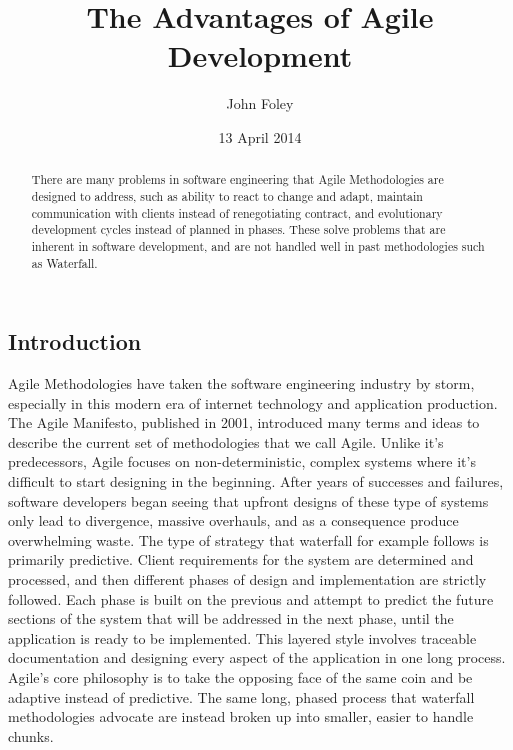 \documentclass[11pt]{article}
\title{The Advantages of Agile Development}
\author{John Foley}
\date{13 April 2014}
\begin{document}
\maketitle

\thispagestyle{empty}

\begin{abstract}
  There are many
 problems in software engineering that Agile Methodologies are designed to address, such as ability to react to 
 change and adapt, maintain communication with clients instead of renegotiating contract, and evolutionary development cycles
 instead of planned in phases. These solve problems that are inherent in software development, and are not handled well in past
 methodologies such as Waterfall. 
\end{abstract}

\begin{doublespace}

\section{Introduction}

Agile Methodologies have taken the software engineering industry by storm, especially in this modern
  era of internet technology and application production. The Agile Manifesto, published in 2001,
 introduced many terms and ideas to describe the current set of methodologies that we call Agile. Unlike it's predecessors,
 Agile focuses on non-deterministic, complex systems where it’s difficult to start designing in the beginning. After years of successes and failures, software developers began seeing that upfront designs of these type of systems only lead to divergence, massive overhauls, and as a consequence produce overwhelming waste. The type of strategy that waterfall for example follows is primarily predictive. Client requirements for the system are determined and processed, and then different phases of design and implementation are strictly followed. Each phase is built on the previous and attempt to predict the future sections of the system that will be addressed in the next phase, until the application is ready to be implemented. This layered style involves traceable documentation and designing every aspect of the application in one long process. Agile’s core philosophy is to take the opposing face of the same coin and be adaptive instead of predictive. The same long, phased process that waterfall methodologies advocate are instead broken up into smaller, easier to handle chunks. 
 

\end{doublespace}
\end{document}
